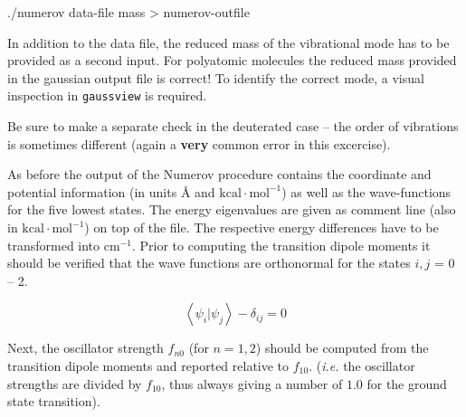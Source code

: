 \documentclass[
  letterpaper,
]{article}
\newenvironment{Shaded}{\begin{snugshade}}{\end{snugshade}}
\newcommand{\ExtensionTok}[1]{\textcolor[rgb]{0.00,0.23,0.31}{#1}}
\newcommand{\NormalTok}[1]{\textcolor[rgb]{0.00,0.23,0.31}{#1}}
\newcommand{\OperatorTok}[1]{\textcolor[rgb]{0.37,0.37,0.37}{#1}}
\begin{document}
\begin{Shaded}
\begin{Highlighting}[]
\ExtensionTok{./numerov}\NormalTok{    data{-}file   mass   }\OperatorTok{\textgreater{}}\NormalTok{ numerov{-}outfile}
\end{Highlighting}
\end{Shaded}

In addition to the data file, the reduced mass of the vibrational mode
has to be provided as a second input. For polyatomic molecules the
reduced mass provided in the gaussian output file is correct! To
identify the correct mode, a visual inspection in \texttt{gaussview} is
required.

\begin{tcolorbox}[enhanced jigsaw, toptitle=1mm, opacitybacktitle=0.6, colframe=quarto-callout-warning-color-frame, toprule=.15mm, breakable, bottomrule=.15mm, left=2mm, title=\textcolor{quarto-callout-warning-color}{\faExclamationTriangle}\hspace{0.5em}{Careful:}, titlerule=0mm, leftrule=.75mm, bottomtitle=1mm, coltitle=black, arc=.35mm, rightrule=.15mm, opacityback=0, colback=white, colbacktitle=quarto-callout-warning-color!10!white]

Be sure to make a separate check in the deuterated case -- the order of
vibrations is sometimes different (again a \textbf{very} common error in
this excercise).

\end{tcolorbox}

As before the output of the Numerov procedure contains the coordinate
and potential information (in units Å and
\(\mathrm{kcal\cdot mol^{-1}}\)) as well as the wave-functions for the
five lowest states. The energy eigenvalues are given as comment line
(also in \(\mathrm{kcal\cdot mol^{-1}}\)) on top of the file. The
respective energy differences have to be transformed into
\(\mathrm{cm^{-1}}\). Prior to computing the transition dipole moments
it should be verified that the wave functions are orthonormal for the
states \(i, j\) = 0 -- 2.

\[
\left < \psi_i | \psi_j \right > - \delta_{ij} = 0
\]

Next, the oscillator strength \(f_{n0}\) (for \(n=1,2\)) should be
computed from the transition dipole moments and reported relative to
\(f_{10}\). (\emph{i.e.} the oscillator strengths are divided by
\(f_{10}\), thus always giving a number of \(1.0\) for the ground state
transition).
\end{document}
